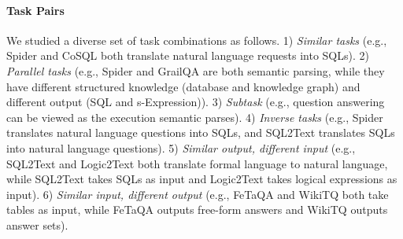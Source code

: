 \documentclass[11pt]{article}
\begin{document}
\iffalse
\paragraph{Task Pairs}
We studied a diverse set of task combinations as follows.
1) \textit{Similar tasks} (e.g., Spider and CoSQL both translate natural language requests into SQLs).
2) \textit{Parallel tasks} (e.g., Spider and GrailQA are both semantic parsing, while they have different structured knowledge (database and knowledge graph) and different output (SQL and s-Expression)).
3) \textit{Subtask} (e.g., question answering can be viewed as the execution semantic parses). 
4) \textit{Inverse tasks} (e.g., Spider translates natural language questions into SQLs, and SQL2Text translates SQLs into natural language questions). 
5) \textit{Similar output, different input} (e.g., SQL2Text and Logic2Text both translate formal language to natural language, while SQL2Text takes SQLs as input and Logic2Text takes logical expressions as input).
6) \textit{Similar input, different output} (e.g., FeTaQA and WikiTQ both take tables as input, while FeTaQA outputs free-form answers and WikiTQ outputs answer sets). 
\end{document}
